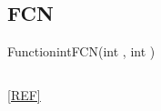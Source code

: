 
\newpage
\subsection{FCN}
\label{FCN}


\begin{deftypefn}{Function}{int}{FCN}({int} , {int} )

\DESCRIPTION

\EXAMPLE
\begin{display}\begin{verbatim}
\end{verbatim}\end{display}

\NOTES

\SEEALSO
\ref{REF}

\end{deftypefn}

